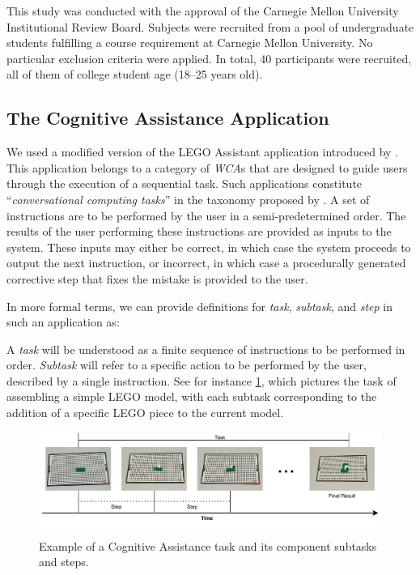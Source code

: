 \documentclass[10pt,letterpaper]{article}
\begin{document}
This study was conducted with the approval of the Carnegie Mellon University Institutional Review Board.
Subjects were recruited from a pool of undergraduate students fulfilling a course requirement at Carnegie Mellon University. 
No particular exclusion criteria were applied. 
In total, 40 participants were recruited, all of them of college student age (\numrange{18}{25} years old).

\subsection{The Cognitive Assistance Application}

We used a modified version of the LEGO Assistant application introduced by \textcite{Chen:EarlyImplementation}.
This application belongs to a category of \emph{WCA}s that are designed to guide users through the execution of a sequential task.
Such applications constitute ``\emph{conversational computing tasks}'' in the taxonomy proposed by \textcite{dabrowsky:2011:40years}.
A set of instructions are to be performed by the user in a semi-predetermined order.
The results of the user performing these instructions are provided as inputs to the system.
These inputs may either be correct, in which case the system proceeds to output the next instruction, or incorrect, in which case a procedurally generated corrective step that fixes the mistake is provided to the user.

In more formal terms, we can provide definitions for \emph{task}, \emph{subtask}, and \emph{step} in such an application as:
\theoremstyle{definition}
\begin{definition}
  A \emph{task} will be understood as a finite sequence of instructions to be performed in order.
  \emph{Subtask} will refer to a specific action to be performed by the user, described by a single instruction.  
  See for instance \cref{fig:task:steps}, which pictures the task of assembling a simple LEGO model, with each subtask corresponding to the addition of a specific LEGO piece to the current model.  
\end{definition}

\begin{figure}[h]
  \centering
  \includegraphics[width=.8\textwidth]{images/step_task_description.pdf}
  \caption{Example of a Cognitive Assistance task and its component subtasks and steps.}\label{fig:task:steps}
\end{figure}
\end{document}
